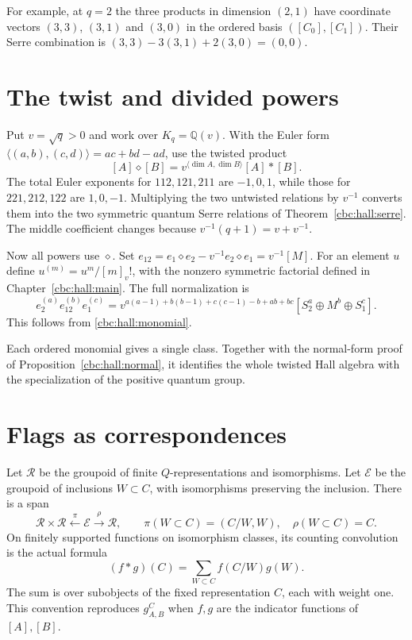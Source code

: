 For example, at $q=2$ the three products in dimension $(2,1)$ have coordinate
vectors $(3,3)$, $(3,1)$ and $(3,0)$ in the ordered basis $([C_0],[C_1])$.
Their Serre combination is $(3,3)-3(3,1)+2(3,0)=(0,0)$.

\section{The twist and divided powers}
Put $v=\sqrt q>0$ and work over $K_q=\mathbb Q(v)$.  With the Euler form
$\langle(a,b),(c,d)\rangle=ac+bd-ad$, use the twisted product
\[
 [A]\diamond[B]=v^{\langle\dim A,\dim B\rangle}[A]*[B].
\]
The total Euler exponents for $112,121,211$ are $-1,0,1$, while those for
$221,212,122$ are $1,0,-1$.  Multiplying the two untwisted relations by
$v^{-1}$ converts them into the two symmetric quantum Serre relations of
Theorem~\ref{cbc:hall:serre}.  The middle coefficient changes because
$v^{-1}(q+1)=v+v^{-1}$.

Now all powers use $\diamond$.  Set
$e_{12}=e_1\diamond e_2-v^{-1}e_2\diamond e_1=v^{-1}[M]$.
For an element $u$ define $u^{(m)}=u^m/[m]_v!$, with the nonzero symmetric
factorial defined in Chapter~\ref{cbc:hall:main}.  The full normalization is
\begin{equation}\label{cbc:hall:divided}
 e_2^{(a)}e_{12}^{(b)}e_1^{(c)}
 =v^{a(a-1)+b(b-1)+c(c-1)-b+ab+bc}
 [S_2^a\oplus M^b\oplus S_1^c].
\end{equation}
This follows from \eqref{cbc:hall:monomial}.

Each ordered monomial gives a
single class.  Together with the normal-form proof of
Proposition~\ref{cbc:hall:normal}, it identifies the whole twisted Hall
algebra with the specialization of the positive quantum group.

\section{Flags as correspondences}
Let $\mathcal R$ be the groupoid of finite $Q$-representations and
isomorphisms.  Let $\mathcal E$ be the groupoid of inclusions $W\subset C$,
with isomorphisms preserving the inclusion.  There is a span
\[
 \mathcal R\times\mathcal R
 \xleftarrow{\ \pi\ }\mathcal E\xrightarrow{\ \rho\ }\mathcal R,
 \qquad \pi(W\subset C)=(C/W,W),\quad \rho(W\subset C)=C.
\]
On finitely supported functions on isomorphism classes, its counting
convolution is the actual formula
\begin{equation}\label{cbc:hall:convolution}
 (f*g)(C)=\sum_{W\subset C}f(C/W)g(W).
\end{equation}
The sum is over subobjects of the fixed representation $C$, each with weight
one.  This convention reproduces $g_{A,B}^C$ when $f,g$ are the indicator
functions of $[A],[B]$.

